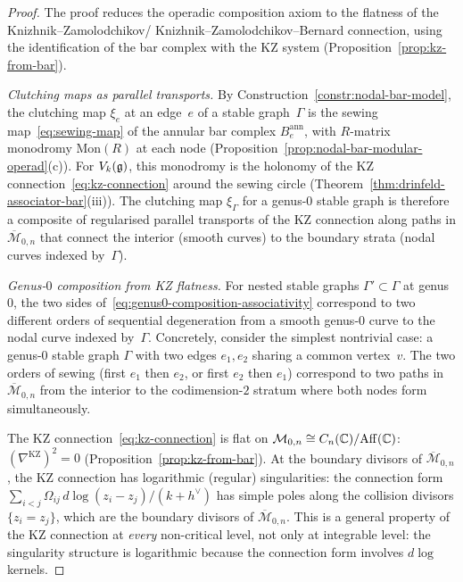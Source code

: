 \begin{proof}
The proof reduces the operadic composition axiom to the
flatness of the Knizhnik--Zamolodchikov\slash
Knizhnik--Zamolodchikov--Bernard connection, using the
identification of the bar complex with the KZ system
\textup{(}Proposition~\textup{\ref{prop:kz-from-bar}}\textup{)}.

\medskip\noindent
\emph{Clutching maps as parallel transports.}
By Construction~\ref{constr:nodal-bar-model}, the clutching
map $\xi_e$ at an edge~$e$ of a stable graph~$\Gamma$ is
the sewing map~\eqref{eq:sewing-map} of the annular bar
complex $B^{\mathrm{ann}}_e$, with
$R$-matrix monodromy $\mathrm{Mon}(R)$ at each node
\textup{(}Proposition~\textup{\ref{prop:nodal-bar-modular-operad}(c)}\textup{)}.
For $V_k(\mathfrak{g})$, this monodromy is the holonomy of the KZ
connection~\eqref{eq:kz-connection} around the sewing circle
\textup{(}Theorem~\textup{\ref{thm:drinfeld-associator-bar}(iii)}\textup{)}.
The clutching map $\xi_\Gamma$ for a genus-$0$ stable graph
is therefore a composite of regularised parallel transports
of the KZ connection along paths in
$\overline{\mathcal{M}}_{0,n}$ that connect the interior
\textup{(}smooth curves\textup{)} to the boundary strata
\textup{(}nodal curves indexed by~$\Gamma$\textup{)}.

\medskip\noindent
\emph{Genus-$0$ composition from KZ flatness.}
For nested stable graphs $\Gamma' \subset \Gamma$ at genus~$0$,
the two sides of~\eqref{eq:genus0-composition-associativity}
correspond to two different orders of sequential degeneration
from a smooth genus-$0$ curve to the nodal curve indexed
by~$\Gamma$.
Concretely, consider the simplest nontrivial case: a genus-$0$
stable graph $\Gamma$ with two edges $e_1, e_2$ sharing a
common vertex~$v$. The two orders of sewing (first $e_1$
then $e_2$, or first $e_2$ then $e_1$) correspond to two
paths in $\overline{\mathcal{M}}_{0,n}$ from the interior to
the codimension-$2$ stratum where both nodes form
simultaneously.

The KZ connection~\eqref{eq:kz-connection} is flat on
$\mathcal{M}_{0,n} \cong C_n(\mathbb{C})/\mathrm{Aff}(\mathbb{C})$:
$(\nabla^{\mathrm{KZ}})^2 = 0$
\textup{(}Proposition~\textup{\ref{prop:kz-from-bar}}\textup{)}.
At the boundary divisors of $\overline{\mathcal{M}}_{0,n}$,
the KZ connection has logarithmic
\textup{(}regular\textup{)} singularities: the connection form
$\sum_{i<j} \Omega_{ij}\, d\log(z_i - z_j)/(k+h^\vee)$ has
simple poles along the collision divisors $\{z_i = z_j\}$,
which are the boundary divisors of
$\overline{\mathcal{M}}_{0,n}$. This is a general property
of the KZ connection at \emph{every} non-critical level, not
only at integrable level: the singularity structure is
logarithmic because the connection form involves $d\log$
kernels.


\end{proof}
